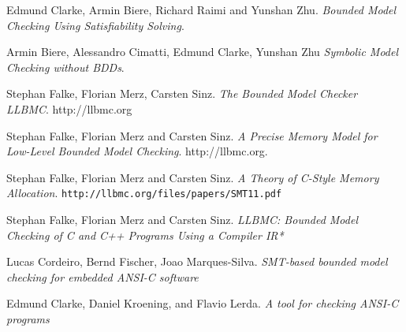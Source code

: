 \documentclass[14pt]{article}
\begin{document}
\begin{thebibliography}{9}
Edmund Clarke, Armin Biere, Richard Raimi and Yunshan Zhu.
\textit{Bounded Model Checking Using Satisfiability Solving}.

Armin Biere, Alessandro Cimatti, Edmund Clarke, Yunshan Zhu
\textit{Symbolic Model Checking without BDDs}. 

Stephan Falke, Florian Merz, Carsten Sinz.
\textit{The Bounded Model Checker LLBMC}. 
http://llbmc.org

Stephan Falke, Florian Merz and Carsten Sinz.
\textit{A Precise Memory Model for Low-Level Bounded Model Checking}.
http://llbmc.org.

Stephan Falke, Florian Merz and Carsten Sinz.
\textit{A Theory of C-Style Memory Allocation}.
\texttt{http://llbmc.org/files/papers/SMT11.pdf}

Stephan Falke, Florian Merz and Carsten Sinz.
\textit{LLBMC: Bounded Model Checking of C and C++ Programs Using a Compiler IR*}

Lucas Cordeiro, Bernd Fischer, Joao Marques-Silva.
\textit{SMT-based bounded model checking for embedded ANSI-C software}

Edmund Clarke, Daniel Kroening, and Flavio Lerda.
\textit{A tool for checking ANSI-C programs}

\end{thebibliography}
\end{document}

